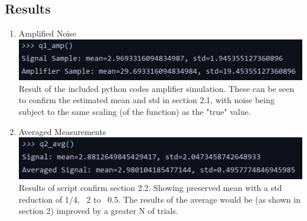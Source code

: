\documentclass[11pt]{article}
\newcommand{\Newpage}{\end{preview}\begin{preview}}
\begin{document}
\begin{preview}
\Newpage
\section{Results}
\begin{enumerate}
        \item Amplified Noise \\
        \includegraphics[width=\linewidth]{inc/q1_out.png} \\
        Result of the included python codes amplifier simulation. These can be seen to confirm the estimated mean and std in section 2.1, with noise being subject to the same scaling (of the function) as the "true" value.


        \item Averaged Measurements \\
        \includegraphics[width=\linewidth]{inc/q2_out.png} \\
        Results of script confirm section 2.2. Showing preserved mean with a std reduction of 1/4, ~2 to ~0.5. The results of the average would be (as shown in section 2) improved by a greater N of trials. 


\end{enumerate}
\end{preview}
\end{document}
